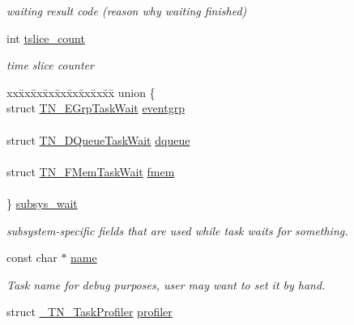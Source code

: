 \begin{DoxyCompactItemize}
\begin{DoxyCompactList}\small\item\em waiting result code (reason why waiting finished) \end{DoxyCompactList}\item 
\hypertarget{structTN__Task_ab3ca332d577071de47d85fb1371f6830}{int \hyperlink{structTN__Task_ab3ca332d577071de47d85fb1371f6830}{tslice\+\_\+count}}\label{structTN__Task_ab3ca332d577071de47d85fb1371f6830}

\begin{DoxyCompactList}\small\item\em time slice counter \end{DoxyCompactList}\item 
\begin{tabbing}
xx\=xx\=xx\=xx\=xx\=xx\=xx\=xx\=xx\=\kill
union \{\\
\>struct \hyperlink{structTN__EGrpTaskWait}{TN\_EGrpTaskWait} \hyperlink{structTN__Task_a22c8cfe2e95d6f891aa568cafdb95936}{eventgrp}\\
\>\\
\>struct \hyperlink{structTN__DQueueTaskWait}{TN\_DQueueTaskWait} \hyperlink{structTN__Task_aa536e1eba96904c006d1e61efc520378}{dqueue}\\
\>\\
\>struct \hyperlink{structTN__FMemTaskWait}{TN\_FMemTaskWait} \hyperlink{structTN__Task_a31921e5384127319bffd5ae09debac1e}{fmem}\\
\>\\
\} \hyperlink{structTN__Task_ae6f4bd3d67e5499ef2c5fb7c72ec6276}{subsys\_wait}\\

\end{tabbing}\begin{DoxyCompactList}\small\item\em subsystem-\/specific fields that are used while task waits for something. \end{DoxyCompactList}\item 
\hypertarget{structTN__Task_aed03c90906ffe2dcbcc49d8badc74147}{const char $\ast$ \hyperlink{structTN__Task_aed03c90906ffe2dcbcc49d8badc74147}{name}}\label{structTN__Task_aed03c90906ffe2dcbcc49d8badc74147}

\begin{DoxyCompactList}\small\item\em Task name for debug purposes, user may want to set it by hand. \end{DoxyCompactList}\item 
\hypertarget{structTN__Task_a206bc3b05e1c660bb4ad9c032f1856b4}{struct \hyperlink{struct__TN__TaskProfiler}{\+\_\+\+T\+N\+\_\+\+Task\+Profiler} \hyperlink{structTN__Task_a206bc3b05e1c660bb4ad9c032f1856b4}{profiler}}\label{structTN__Task_a206bc3b05e1c660bb4ad9c032f1856b4}


\end{DoxyCompactItemize}
